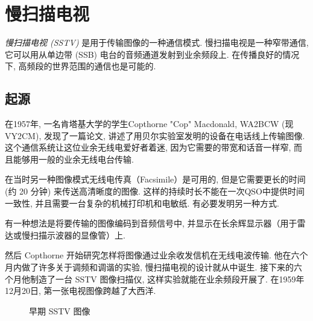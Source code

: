 \chapter{慢扫描电视}

{\em 慢扫描电视 (SSTV)} 是用于传输图像的一种通信模式. 慢扫描电视是一种窄带通信, 它可以用从单边带 (SSB) 电台的音频通道发射到业余频段上. 在传播良好的情况下, 高频段的世界范围的通信也是可能的. 

\section{起源}

在1957年, 一名肯塔基大学的学生Copthorne "Cop" Macdonald, WA2BCW (现VY2CM), 发现了一篇论文, 讲述了用贝尔实验室发明的设备在电话线上传输图像. 这个通信系统让这位业余无线电爱好者着迷, 因为它需要的带宽和话音一样窄, 而且能够用一般的业余无线电台传输. 

在当时另一种图像模式无线电传真（Facsimile）是可用的, 但是它需要更长的时间 (约 20 分钟) 来传送高清晰度的图像. 这样的持续时长不能在一次QSO中提供时间一致性, 并且需要一台复杂的机械打印机和电敏纸. 有必要发明另一种方式. 

有一种想法是将要传输的图像编码到音频信号中, 并显示在长余辉显示器（用于雷达或慢扫描示波器的显像管）上. 

然后 Copthorne 开始研究怎样将图像通过业余收发信机在无线电波传输. 他在六个月内做了许多关于调频和调谐的实验, 慢扫描电视的设计就从中诞生. 接下来的六个月他制造了一台 SSTV 图像扫描仪, 这样实验就能在业余频段开展了. 在1959年12月20日, 第一张电视图像跨越了大西洋. 

\begin{figure}
	\centering
	\caption{早期 SSTV 图像}
\end{figure}
	
